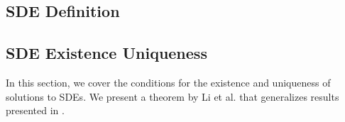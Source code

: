 \documentclass[12pt]{article}
\newtheorem{theorem}{Theorem}[section]
\theoremstyle{definition}
\numberwithin{equation}{section}
\newcommand{\ev}[1]{\mathbb{E}\left[{#1}\right]}
\begin{document}
\subsection{SDE Definition}
\label{subsec:SDEDefinition}


\subsection{SDE Existence Uniqueness}
\label{subsec:SDEExistenceUniqueness}
In this section, we cover the conditions for the existence and uniqueness of solutions to SDEs. We present a theorem by Li et al. \cite{liStochasticModifiedEquations2019} that generalizes results presented in \cite{oksendalStochasticDifferentialEquations2003}. 
\end{document}
